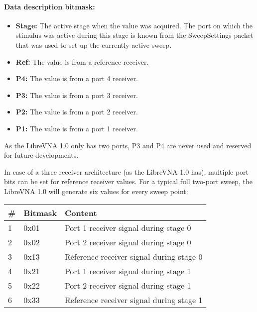 \documentclass[a4paper,11pt]{article}
\newcommand{\bitrect}[2]{
  \begin{pgfonlayer}{foreground}
    \draw [thick] (0,0) rectangle (#1,1);
    \pgfmathsetmacro\result{#1-1}
    \foreach \x in {1,...,\result}
      \draw [thick] (\x,1) -- (\x, 0.8);
  \end{pgfonlayer}
  \bitlabels{#1}{#2}
}
\newcommand{\rwbits}[3]{
  \draw [thick] (#1,0) rectangle ++(#2,1) node[pos=0.5]{#3};
  \pgfmathsetmacro\start{#1+0.5}
  \pgfmathsetmacro\finish{#1+#2-0.5}
}
\newcommand{\bitlabels}[2]{
  \foreach \bit in {1,...,#1}{
     \pgfmathsetmacro\result{#2}
     \node [above] at (\bit-0.5, 1) {\pgfmathprintnumber{\result}};
   }
}
\begin{document}
\paragraph{Data description bitmask:}
\begin{center}
\end{center}
\begin{itemize}
\item \textbf{Stage:} The active stage when the value was acquired. The port on which the stimulus was active during this stage is known from the SweepSettings packet that was used to set up the currently active sweep.
\item \textbf{Ref:} The value is from a reference receiver.
\item \textbf{P4:} The value is from a port 4 receiver.
\item \textbf{P3:} The value is from a port 3 receiver.
\item \textbf{P2:} The value is from a port 2 receiver.
\item \textbf{P1:} The value is from a port 1 receiver.
\end{itemize}
As the LibreVNA 1.0 only has two ports, P3 and P4 are never used and reserved for future developments.

In case of a three receiver architecture (as the LibreVNA 1.0 has), multiple port bits can be set for reference receiver values. For a typical full two-port sweep, the LibreVNA 1.0 will generate six values for every sweep point:
\begin{ThreePartTable}
\setlength\tabcolsep{3pt}

\begin{longtable}{p{} |  p{}  |  p{}}
\toprule
\textbf{\#} &\textbf{Bitmask} &\textbf{Content} \\ 
\hline
\endhead
\midrule[\heavyrulewidth]
\endfoot  
\midrule[\heavyrulewidth]
\endlastfoot

1 & 0x01 & Port 1 receiver signal during stage 0 \\
2 & 0x02 & Port 2 receiver signal during stage 0 \\
3 & 0x13 & Reference receiver signal during stage 0 \\
4 & 0x21 & Port 1 receiver signal during stage 1 \\
5 & 0x22 & Port 2 receiver signal during stage 1 \\
6 & 0x33 & Reference receiver signal during stage 1 \\
\end{longtable}   
\end{ThreePartTable}
\end{document}

